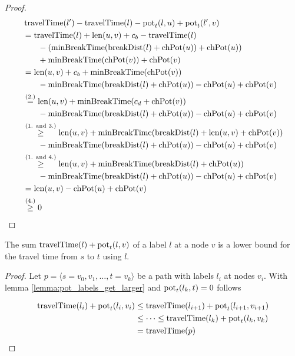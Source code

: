 \begin{proof}
	\begin{align}
		\begin{split}\label{eq:label_feasibility_proof_2}
			&\concretett(l') - \concretett(l) - \concretepotential_t(l,u) + \concretepotential_t(l',v)\\
			&= \concretett(l) + \len(u,v) + \restr_b - \concretett(l)\\
			& \phantom{{}=1} - (\minBreakTime(\breakDist(l) + \chpotential(u)) + \chpotential(u))\\
			& \phantom{{}=1} + \minBreakTime(\chpotential(v)) + \chpotential(v)\\
			&=  \len(u,v) + \restr_b + \minBreakTime(\chpotential(v))\\
			& \phantom{{}=1} - \minBreakTime(\breakDist(l)+\chpotential(u)) - \chpotential(u) + \chpotential(v)\\
			&\stackrel{\text{(2.)}}{=}  \len(u,v) + \minBreakTime(\restr_d + \chpotential(v))\\
			& \phantom{{}=1} - \minBreakTime(\breakDist(l)+\chpotential(u)) - \chpotential(u) + \chpotential(v)\\
			&\stackrel{\text{(1. and 3.)}}{\ge} \len(u,v) + \minBreakTime(\breakDist(l) + \len(u,v) + \chpotential(v))\\
			& \phantom{{}=1} - \minBreakTime(\breakDist(l)+\chpotential(u)) - \chpotential(u) + \chpotential(v)\\
			&\stackrel{\text{(1. and 4.)}}{\ge} \len(u,v) + \minBreakTime(\breakDist(l) + \chpotential(u))\\
			& \phantom{{}=1} - \minBreakTime(\breakDist(l)+\chpotential(u)) - \chpotential(u) + \chpotential(v)\\
			&=  \len(u,v) - \chpotential(u) + \chpotential(v)\\
			&\stackrel{\text{(4.)}}{\ge} 0
		\end{split}
	\end{align}
\end{proof}

\begin{lemma}\label{lemma:pot_lower_bound_csp}
	The sum $\operatorname{travelTime}(l) + \operatorname{pot}_t(l,v)$ of a label $l$ at a node $v$ is a lower bound for the travel time from $s$ to $t$ using $l$.
\end{lemma}

\begin{proof}
	Let $p = \langle s=v_0,v_1,\ldots,t=v_k \rangle$ be a path with labels $l_i$ at nodes $v_i$. With lemma \ref{lemma:pot_labels_get_larger} and $\operatorname{pot}_t(l_k,t) = 0$ follows

	\begin{align*}
		\operatorname{travelTime}(l_{i}) + \operatorname{pot}_t(l_{i},v_{i}) & \le \operatorname{travelTime}(l_{i+1}) + \operatorname{pot}_t(l_{i+1},v_{i+1})     \\
		                                                       & \le \dots \le \operatorname{travelTime}(l_{k}) + \operatorname{pot}_t(l_{k},v_{k}) \\
		                                                       & = \operatorname{travelTime}(p)
	\end{align*}

\end{proof}


